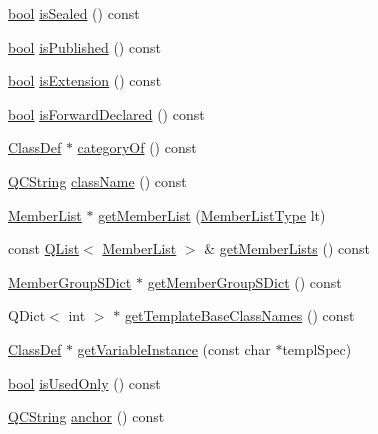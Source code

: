 \begin{DoxyCompactItemize}
\item 
\hyperlink{qglobal_8h_a1062901a7428fdd9c7f180f5e01ea056}{bool} \hyperlink{class_class_def_a33538da7a031fa9757a3d503edfcaf60}{is\+Sealed} () const 
\item 
\hyperlink{qglobal_8h_a1062901a7428fdd9c7f180f5e01ea056}{bool} \hyperlink{class_class_def_a57474650a3b385e88dbd8304b8b93fa1}{is\+Published} () const 
\item 
\hyperlink{qglobal_8h_a1062901a7428fdd9c7f180f5e01ea056}{bool} \hyperlink{class_class_def_afea156268747f0ed4cd135ed2d5ee8f1}{is\+Extension} () const 
\item 
\hyperlink{qglobal_8h_a1062901a7428fdd9c7f180f5e01ea056}{bool} \hyperlink{class_class_def_adb3ee85888a3f2972b66a56260fc1f65}{is\+Forward\+Declared} () const 
\item 
\hyperlink{class_class_def}{Class\+Def} $\ast$ \hyperlink{class_class_def_a1d2fa37010681cbe623dac11a12eb806}{category\+Of} () const 
\item 
\hyperlink{class_q_c_string}{Q\+C\+String} \hyperlink{class_class_def_ac2305dda1a69fa632d9b95fb9aa4c57a}{class\+Name} () const 
\item 
\hyperlink{class_member_list}{Member\+List} $\ast$ \hyperlink{class_class_def_a040a167e9cab0587d1eed22f22fe2c56}{get\+Member\+List} (\hyperlink{types_8h_abe8ad5992f8938a28f918f51b199aa19}{Member\+List\+Type} lt)
\item 
const \hyperlink{class_q_list}{Q\+List}$<$ \hyperlink{class_member_list}{Member\+List} $>$ \& \hyperlink{class_class_def_aebbaebd8701a1dc727f743ba09c1b82d}{get\+Member\+Lists} () const 
\item 
\hyperlink{class_member_group_s_dict}{Member\+Group\+S\+Dict} $\ast$ \hyperlink{class_class_def_a577aa3fd4bd986fc9aae448833e945dc}{get\+Member\+Group\+S\+Dict} () const 
\item 
Q\+Dict$<$ int $>$ $\ast$ \hyperlink{class_class_def_a26679fe9d321cd990b1657f5ad17a144}{get\+Template\+Base\+Class\+Names} () const 
\item 
\hyperlink{class_class_def}{Class\+Def} $\ast$ \hyperlink{class_class_def_ab9f9b3544327fa23a59b4a37c9b8a96c}{get\+Variable\+Instance} (const char $\ast$templ\+Spec)
\item 
\hyperlink{qglobal_8h_a1062901a7428fdd9c7f180f5e01ea056}{bool} \hyperlink{class_class_def_a383e2326542bd5b412d198debcba3feb}{is\+Used\+Only} () const 
\item 
\hyperlink{class_q_c_string}{Q\+C\+String} \hyperlink{class_class_def_a28f29dbbc5c2646bc64bae479fd7b905}{anchor} () const 

\end{DoxyCompactItemize}
